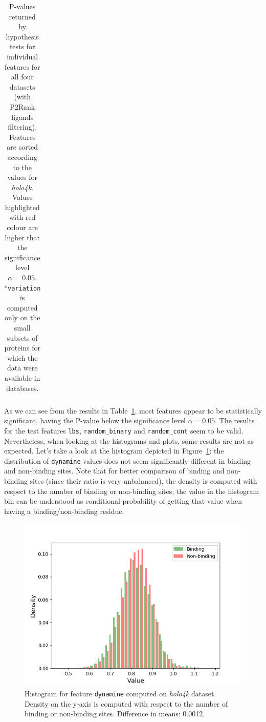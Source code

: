 \begin{table}[]
\begin{tabular}{@{}lllll@{}}
\end{tabular}
\caption[P-values returned by hypothesis tests for individual features]{P-values returned by hypothesis tests for individual features for all four datasets (with P2Rank ligands filtering). Features are sorted according to the values for \textit{holo4k}. Values highlighted with red colour are higher that the significance level $\alpha = 0.05$.\\\hspace{\textwidth}
*\texttt{variation} is computed only on the small subsets of proteins for which the data were available in databases.}
\label{tab:pvaluesAll}
\end{table}

As we can see from the results in Table~\ref{tab:pvaluesAll}, most features appear to be statistically significant, having the P-value below the significance level $\alpha=0.05$.
The results for the test features \texttt{lbs}, \texttt{random\_binary} and \texttt{random\_cont} seem to be valid. Nevertheless, when looking at the histograms and plots, some results are not as expected. Let's take a look at the histogram depicted in Figure~\ref{fig:dynamine}: the distribution of \texttt{dynamine} values does not seem significantly different in binding and non-binding sites. Note that for better comparison of binding and non-binding sites (since their ratio is very unbalanced), the density is computed with respect to the number of binding or non-binding sites; the value in the histogram bin can be understood as conditional probability of getting that value when having a binding/non-binding residue.

\begin{figure}[]
\centering
\includegraphics[width=120mm]{../img/dynamine_hist.png}
\caption[Histogram for feature \texttt{dynamine}]{Histogram for feature \texttt{dynamine} computed on \textit{holo4k} dataset. Density on the y-axis is computed with respect to the number of binding or non-binding sites. Difference in means: 0.0012.}
\label{fig:dynamine}
\end{figure}


